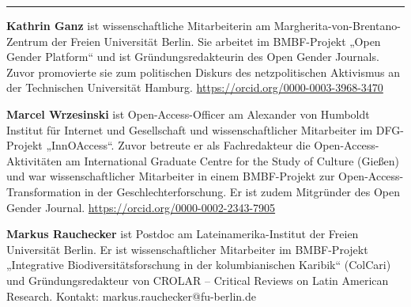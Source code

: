 \begin{center}\rule{0.5\linewidth}{\linethickness}\end{center}

\textbf{Kathrin Ganz} ist wissenschaftliche Mitarbeiterin am
Margherita-von-Brentano-Zentrum der Freien Universität Berlin. Sie
arbeitet im BMBF-Projekt „Open Gender Platform`` und ist
Gründungsredakteurin des Open Gender Journals. Zuvor promovierte sie zum
politischen Diskurs des netzpolitischen Aktivismus an der Technischen
Universität Hamburg. \url{https://orcid.org/0000-0003-3968-3470}

\textbf{Marcel Wrzesinski} ist Open-Access-Officer am Alexander von
Humboldt Institut für Internet und Gesellschaft und wissenschaftlicher
Mitarbeiter im DFG-Projekt „InnOAccess``. Zuvor betreute er als
Fachredakteur die Open-Access-Aktivitäten am International Graduate
Centre for the Study of Culture (Gießen) und war wissenschaftlicher
Mitarbeiter in einem BMBF-Projekt zur Open-Access-Transformation in der
Geschlechterforschung. Er ist zudem Mitgründer des Open Gender Journal.
\url{https://orcid.org/0000-0002-2343-7905}

\textbf{Markus Rauchecker} ist Postdoc am Lateinamerika-Institut der
Freien Universität Berlin. Er ist wissenschaftlicher Mitarbeiter im
BMBF-Projekt „Integrative Biodiversitätsforschung in der kolumbianischen
Karibik`` (ColCari) und Gründungsredakteur von CROLAR -- Critical
Reviews on Latin American Research. Kontakt:
markus.rauchecker@fu-berlin.de
